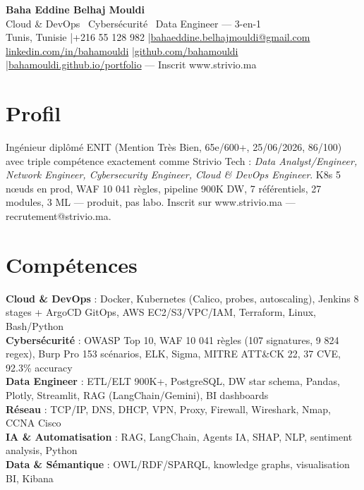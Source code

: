 \documentclass[a4paper,10pt]{article}
\begin{document}
\begin{center}
{\LARGE\bfseries\color{navy} Baha Eddine Belhaj Mouldi}\\[4pt]
{\large Cloud \& DevOps \textbar\ Cybersécurité \textbar\ Data Engineer — 3-en-1}\\[6pt]
\normalsize
Tunis, Tunisie \quad|\quad +216 55 128 982 \quad|\quad \href{mailto:bahaeddine.belhajmouldi@gmail.com}{bahaeddine.belhajmouldi@gmail.com}\\[2pt]
\href{https://www.linkedin.com/in/bahamouldi}{linkedin.com/in/bahamouldi} \quad|\quad \href{https://github.com/bahamouldi}{github.com/bahamouldi} \quad|\quad \href{https://bahamouldi.github.io/portfolio/}{bahamouldi.github.io/portfolio} — Inscrit www.strivio.ma
\end{center}
\vspace{4pt}

\section{Profil}
Ingénieur diplômé ENIT (Mention Très Bien, 65e/600+, 25/06/2026, 86/100) avec triple compétence exactement comme Strivio Tech : \textit{Data Analyst/Engineer, Network Engineer, Cybersecurity Engineer, Cloud \& DevOps Engineer}. K8s 5 nœuds en prod, WAF 10 041 règles, pipeline 900K DW, 7 référentiels, 27 modules, 3 ML — produit, pas labo. Inscrit sur www.strivio.ma — recrutement@strivio.ma.

\section{Compétences}
\textbf{Cloud \& DevOps} : Docker, Kubernetes (Calico, probes, autoscaling), Jenkins 8 stages + ArgoCD GitOps, AWS EC2/S3/VPC/IAM, Terraform, Linux, Bash/Python\\[2pt]
\textbf{Cybersécurité} : OWASP Top 10, WAF 10 041 règles (107 signatures, 9 824 regex), Burp Pro 153 scénarios, ELK, Sigma, MITRE ATT\&CK 22, 37 CVE, 92.3\% accuracy\\[2pt]
\textbf{Data Engineer} : ETL/ELT 900K+, PostgreSQL, DW star schema, Pandas, Plotly, Streamlit, RAG (LangChain/Gemini), BI dashboards\\[2pt]
\textbf{Réseau} : TCP/IP, DNS, DHCP, VPN, Proxy, Firewall, Wireshark, Nmap, CCNA Cisco\\[2pt]
\textbf{IA \& Automatisation} : RAG, LangChain, Agents IA, SHAP, NLP, sentiment analysis, Python\\[2pt]
\textbf{Data \& Sémantique} : OWL/RDF/SPARQL, knowledge graphs, visualisation BI, Kibana
\end{document}
